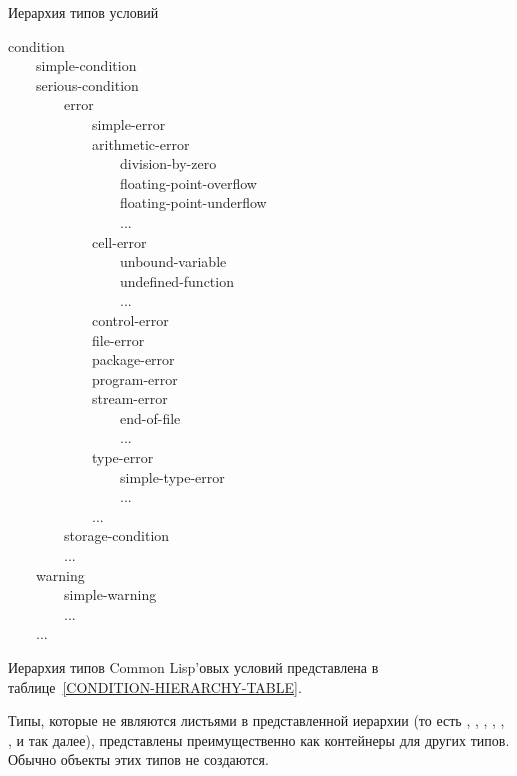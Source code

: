 \begin{table}[t]
\caption{Иерархия типов условий}
\label{CONDITION-HIERARCHY-TABLE}
\begin{lisp}
condition \\
~~~~simple-condition \\
~~~~serious-condition \\
~~~~~~~~error \\
~~~~~~~~~~~~simple-error \\
~~~~~~~~~~~~arithmetic-error \\
~~~~~~~~~~~~~~~~division-by-zero \\
~~~~~~~~~~~~~~~~floating-point-overflow \\
~~~~~~~~~~~~~~~~floating-point-underflow \\
~~~~~~~~~~~~~~~~... \\
~~~~~~~~~~~~cell-error \\
~~~~~~~~~~~~~~~~unbound-variable \\
~~~~~~~~~~~~~~~~undefined-function \\
~~~~~~~~~~~~~~~~... \\
~~~~~~~~~~~~control-error \\
~~~~~~~~~~~~file-error \\
~~~~~~~~~~~~package-error \\
~~~~~~~~~~~~program-error \\
~~~~~~~~~~~~stream-error \\
~~~~~~~~~~~~~~~~end-of-file \\
~~~~~~~~~~~~~~~~... \\
~~~~~~~~~~~~type-error \\
~~~~~~~~~~~~~~~~simple-type-error \\
~~~~~~~~~~~~~~~~... \\
~~~~~~~~~~~~... \\
~~~~~~~~storage-condition \\
~~~~~~~~... \\
~~~~warning \\
~~~~~~~~simple-warning \\
~~~~~~~~... \\
~~~~...
\end{lisp}
\vfill
\end{table}

Иерархия типов Common Lisp'овых условий представлена в
таблице~\ref{CONDITION-HIERARCHY-TABLE}.

Типы, которые не являются листьями в представленной иерархии (то есть
, , , ,
, , и так далее), представлены
преимущественно как контейнеры для других типов. Обычно объекты этих типов не
создаются.

